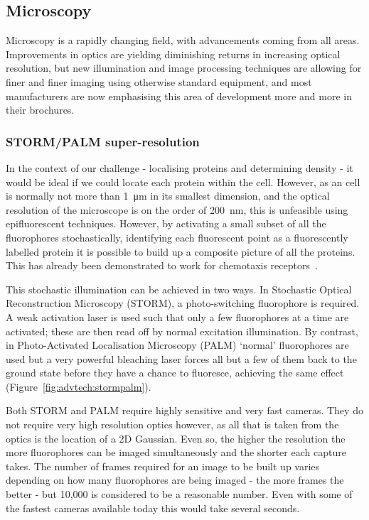 \documentclass[../main.tex]{subfiles}
\begin{document}
\subsection{Microscopy}

Microscopy is a rapidly changing field, with advancements coming from all areas. Improvements in optics are yielding diminishing returns in increasing optical resolution, but new illumination and image processing techniques are allowing for finer and finer imaging using otherwise standard equipment, and most manufacturers are now emphasising this area of development more and more in their brochures.

\subsubsection{STORM/PALM super-resolution}
In the context of our challenge - localising proteins and determining density - it would be ideal if we could locate each protein within the \ecoli cell. However, as an \ecoli cell is normally not more than \SI{1}{\micro\meter} in its smallest dimension, and the optical resolution of the microscope is on the order of \SI{200}{\nano\meter}, this is unfeasible using epifluorescent techniques. However, by activating a small subset of all the fluorophores stochastically, identifying each fluorescent point as a fluorescently labelled protein it is possible to build up a composite picture of all the proteins. This has already been demonstrated to work for \ecoli chemotaxis receptors~\citep{greenfield09}.

This stochastic illumination can be achieved in two ways. In Stochastic Optical Reconstruction Microscopy (STORM), a photo-switching fluorophore is required. A weak activation laser is used such that only a few fluorophores at a time are activated; these are then read off by normal excitation illumination. By contrast, in Photo-Activated Localisation Microscopy (PALM) `normal' fluorophores are used but a very powerful bleaching laser forces all but a few of them back to the ground state before they have a chance to fluoresce, achieving the same effect (Figure~\ref{fig:advtech:stormpalm}).

Both STORM and PALM require highly sensitive and very fast cameras. They do not require very high resolution optics however, as all that is taken from the optics is the location of a 2D Gaussian. Even so, the higher the resolution the more fluorophores can be imaged simultaneously and the shorter each capture takes. The number of frames required for an image to be built up varies depending on how many fluorophores are being imaged - the more frames the better - but 10,000 is considered to be a reasonable number. Even with some of the fastest cameras available today this would take several seconds.
\end{document}
